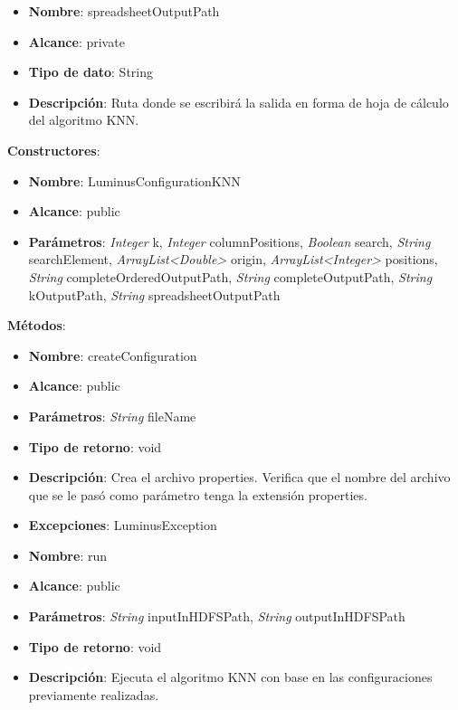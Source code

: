 \begin{UClist}
\begin{itemize}
	\end{itemize}
	\begin{itemize}
		\item \textbf{Nombre}: spreadsheetOutputPath
		\item \textbf{Alcance}: private
		\item \textbf{Tipo de dato}: String
		\item \textbf{Descripción}: Ruta donde se escribirá la salida en forma de hoja de cálculo del algoritmo KNN.\\
	\end{itemize}
\end{UClist}

\textbf{Constructores}:
\begin{UClist}
	\begin{itemize}
		\item \textbf{Nombre}: LuminusConfigurationKNN
		\item \textbf{Alcance}: public
		\item \textbf{Parámetros}: \emph{Integer} k, \emph{Integer} columnPositions, \emph{Boolean} search, \emph{String} searchElement, \emph{ArrayList<Double>} origin, \emph{ArrayList<Integer>} positions, \emph{String} completeOrderedOutputPath, \emph{String} completeOutputPath, \emph{String} kOutputPath, \emph{String} spreadsheetOutputPath
	\end{itemize}
\end{UClist}

\textbf{Métodos}:
\begin{UClist}
	\begin{itemize}
		\item \textbf{Nombre}: createConfiguration
		\item \textbf{Alcance}: public
		\item \textbf{Parámetros}: \emph{String} fileName
		\item \textbf{Tipo de retorno}: void
		\item \textbf{Descripción}: Crea el archivo properties. Verifica que el nombre del archivo que se le pasó como parámetro tenga la extensión properties.
		\item \textbf{Excepciones}: LuminusException
	\end{itemize}
	\begin{itemize}
		\item \textbf{Nombre}: run
		\item \textbf{Alcance}: public
		\item \textbf{Parámetros}: \emph{String} inputInHDFSPath, \emph{String} outputInHDFSPath
		\item \textbf{Tipo de retorno}: void
		\item \textbf{Descripción}: Ejecuta el algoritmo KNN con base en las configuraciones previamente realizadas.
	\end{itemize}
\end{UClist}
